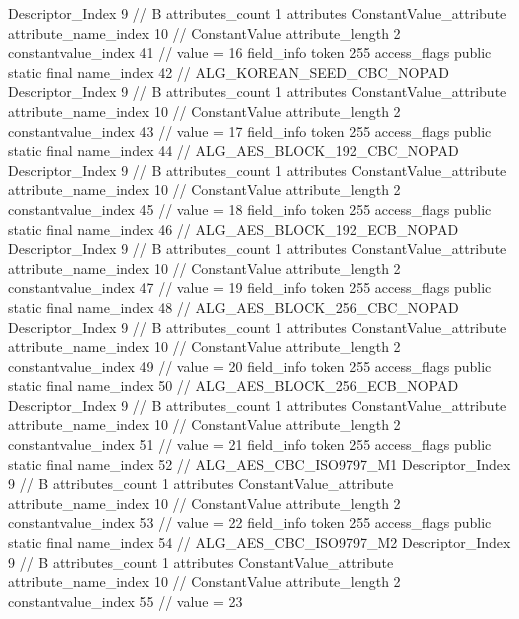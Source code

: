 {{{{{				Descriptor_Index	9		// B
				attributes_count	1
				attributes {
				ConstantValue_attribute {
					attribute_name_index	10		// ConstantValue
					attribute_length	2
					constantvalue_index	41		// value = 16
				}
				}
			}
			field_info {
				token	255
				access_flags	public static final
				name_index	42		// ALG_KOREAN_SEED_CBC_NOPAD
				Descriptor_Index	9		// B
				attributes_count	1
				attributes {
				ConstantValue_attribute {
					attribute_name_index	10		// ConstantValue
					attribute_length	2
					constantvalue_index	43		// value = 17
				}
				}
			}
			field_info {
				token	255
				access_flags	public static final
				name_index	44		// ALG_AES_BLOCK_192_CBC_NOPAD
				Descriptor_Index	9		// B
				attributes_count	1
				attributes {
				ConstantValue_attribute {
					attribute_name_index	10		// ConstantValue
					attribute_length	2
					constantvalue_index	45		// value = 18
				}
				}
			}
			field_info {
				token	255
				access_flags	public static final
				name_index	46		// ALG_AES_BLOCK_192_ECB_NOPAD
				Descriptor_Index	9		// B
				attributes_count	1
				attributes {
				ConstantValue_attribute {
					attribute_name_index	10		// ConstantValue
					attribute_length	2
					constantvalue_index	47		// value = 19
				}
				}
			}
			field_info {
				token	255
				access_flags	public static final
				name_index	48		// ALG_AES_BLOCK_256_CBC_NOPAD
				Descriptor_Index	9		// B
				attributes_count	1
				attributes {
				ConstantValue_attribute {
					attribute_name_index	10		// ConstantValue
					attribute_length	2
					constantvalue_index	49		// value = 20
				}
				}
			}
			field_info {
				token	255
				access_flags	public static final
				name_index	50		// ALG_AES_BLOCK_256_ECB_NOPAD
				Descriptor_Index	9		// B
				attributes_count	1
				attributes {
				ConstantValue_attribute {
					attribute_name_index	10		// ConstantValue
					attribute_length	2
					constantvalue_index	51		// value = 21
				}
				}
			}
			field_info {
				token	255
				access_flags	public static final
				name_index	52		// ALG_AES_CBC_ISO9797_M1
				Descriptor_Index	9		// B
				attributes_count	1
				attributes {
				ConstantValue_attribute {
					attribute_name_index	10		// ConstantValue
					attribute_length	2
					constantvalue_index	53		// value = 22
				}
				}
			}
			field_info {
				token	255
				access_flags	public static final
				name_index	54		// ALG_AES_CBC_ISO9797_M2
				Descriptor_Index	9		// B
				attributes_count	1
				attributes {
				ConstantValue_attribute {
					attribute_name_index	10		// ConstantValue
					attribute_length	2
					constantvalue_index	55		// value = 23
}}}}}}}

